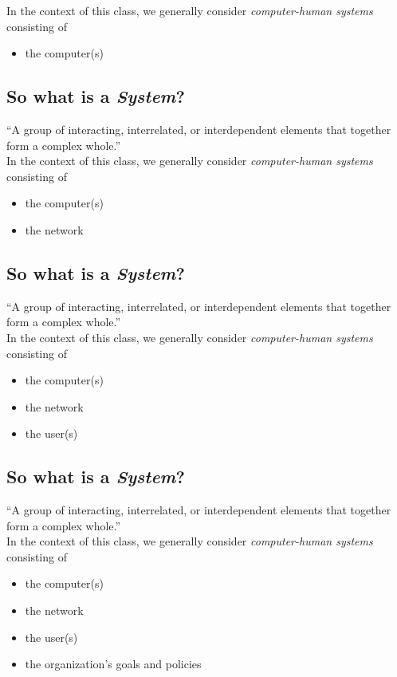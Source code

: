 \documentclass[xga]{xdvislides}
\begin{document}
In the context of this class, we generally consider {\em computer-human
systems} consisting of

\begin{itemize}
	\item the computer(s)
\end{itemize}

\subsection{So what is a {\em System}?}
``A group of interacting, interrelated, or interdependent elements that
together form a complex whole.''
\\

In the context of this class, we generally consider {\em computer-human
systems} consisting of

\begin{itemize}
	\item the computer(s)
	\item the network
\end{itemize}

\subsection{So what is a {\em System}?}
``A group of interacting, interrelated, or interdependent elements that
together form a complex whole.''
\\

In the context of this class, we generally consider {\em computer-human
systems} consisting of

\begin{itemize}
	\item the computer(s)
	\item the network
	\item the user(s)
\end{itemize}

\subsection{So what is a {\em System}?}
``A group of interacting, interrelated, or interdependent elements that
together form a complex whole.''
\\

In the context of this class, we generally consider {\em computer-human
systems} consisting of

\begin{itemize}
	\item the computer(s)
	\item the network
	\item the user(s)
	\item the organization's goals and policies
\end{itemize}
\end{document}
